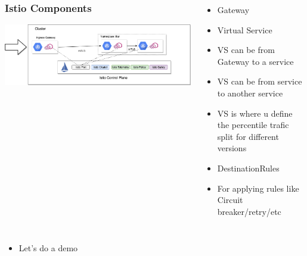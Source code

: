 \documentclass[12pt]{beamer}
\begin{document}
                \begin{frame}
                    \begin{columns}
                            \begin{center}
                                \frametitle{Istio Components}
                                \includegraphics[width=1\textwidth]{images/components.png}
                            \end{center}
        
                            \begin{itemize}
                                \pause
                                \item Gateway
                                \pause
                                \item Virtual Service
                                \pause
                                \item VS can be from Gateway to a service
                                \item VS can be from service to another service
                                \pause
                                \item VS is where u define the percentile trafic split for different versions
                                \pause
                                \item DestinationRules
                                \item For applying rules like Circuit breaker/retry/etc
                            \end{itemize}
                        \end{columns}
                    \end{frame}

                    \begin{frame}
                        \begin{itemize}
                            \item Let's do a demo
                        \end{itemize}        
                    \end{frame}
    
    
\end{document}
